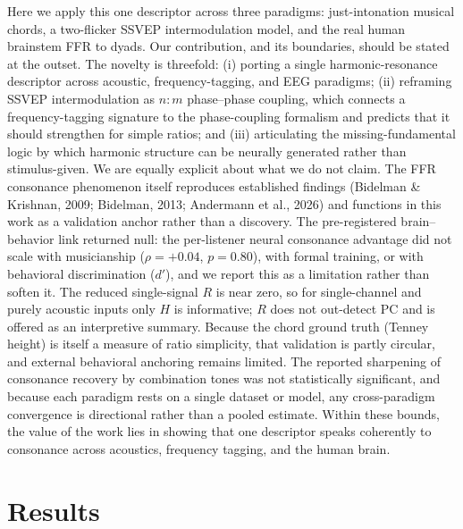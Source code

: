 \documentclass[11pt]{article}
\begin{document}
Here we apply this one descriptor across three paradigms: just-intonation musical chords, a two-flicker SSVEP intermodulation model, and the real human brainstem FFR to dyads. Our contribution, and its boundaries, should be stated at the outset. The novelty is threefold: (i) porting a single harmonic-resonance descriptor across acoustic, frequency-tagging, and EEG paradigms; (ii) reframing SSVEP intermodulation as $n{:}m$ phase--phase coupling, which connects a frequency-tagging signature to the phase-coupling formalism and predicts that it should strengthen for simple ratios; and (iii) articulating the missing-fundamental logic by which harmonic structure can be neurally generated rather than stimulus-given. We are equally explicit about what we do not claim. The FFR consonance phenomenon itself reproduces established findings (Bidelman \& Krishnan, 2009; Bidelman, 2013; Andermann et al., 2026) and functions in this work as a validation anchor rather than a discovery. The pre-registered brain--behavior link returned null: the per-listener neural consonance advantage did not scale with musicianship ($\rho=+0.04$, $p=0.80$), with formal training, or with behavioral discrimination ($d'$), and we report this as a limitation rather than soften it. The reduced single-signal $R$ is near zero, so for single-channel and purely acoustic inputs only $H$ is informative; $R$ does not out-detect $\mathrm{PC}$ and is offered as an interpretive summary. Because the chord ground truth (Tenney height) is itself a measure of ratio simplicity, that validation is partly circular, and external behavioral anchoring remains limited. The reported sharpening of consonance recovery by combination tones was not statistically significant, and because each paradigm rests on a single dataset or model, any cross-paradigm convergence is directional rather than a pooled estimate. Within these bounds, the value of the work lies in showing that one descriptor speaks coherently to consonance across acoustics, frequency tagging, and the human brain.

\section{Results}
\end{document}
